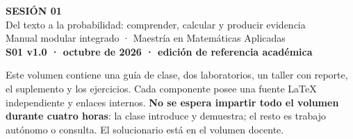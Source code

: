 \documentclass[11pt,a4paper,oneside]{report}
\begin{document}
\begin{center}
{\Huge\bfseries\color{azul} SESIÓN 01}\\[6pt]
{\LARGE Del texto a la probabilidad: comprender, calcular y producir evidencia}\\[8pt]
{\large Manual modular integrado · Maestría en Matemáticas Aplicadas}\\[5pt]
\textbf{S01 v1.0 · octubre de 2026 · edición de referencia académica}
\end{center}
\begin{idea}
Este volumen contiene una guía de clase, dos laboratorios, un taller con
reporte, el suplemento y los ejercicios. Cada componente posee una fuente
LaTeX independiente y enlaces internos. \textbf{No se espera impartir todo
el volumen durante cuatro horas}: la clase introduce y demuestra; el resto
es trabajo autónomo o consulta. El solucionario está en el volumen docente.
\end{idea}
\clearpage\begingroup\small\tableofcontents\endgroup\clearpage












\end{document}
